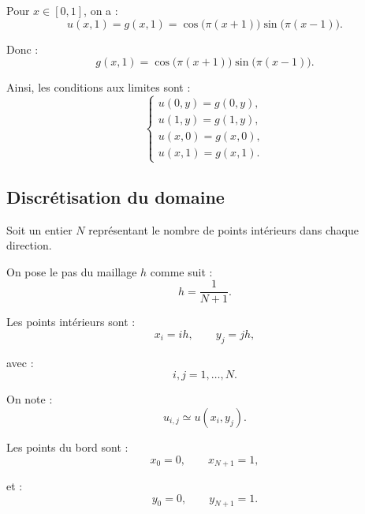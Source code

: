 \documentclass[12pt,a4paper]{article}
\begin{document}
	Pour \(x\in[0,1]\), on a :
	\begin{equation*}
	u(x,1)
	=
	g(x,1)
	=
	\cos\bigl(\pi(x+1)\bigr)
	\sin\bigl(\pi(x-1)\bigr).
	\end{equation*}
	
	Donc :
	\begin{equation*}
	\boxed{
		g(x,1)
		=
		\cos\bigl(\pi(x+1)\bigr)
		\sin\bigl(\pi(x-1)\bigr).
	}
	\end{equation*}
	
	Ainsi, les conditions aux limites sont :
	\begin{equation*}
	\boxed{
		\begin{cases}
		u(0,y)=g(0,y),\\
		u(1,y)=g(1,y),\\
		u(x,0)=g(x,0),\\
		u(x,1)=g(x,1).
		\end{cases}
	}
	\end{equation*}
	
	\subsection{Discrétisation du domaine}
	
	Soit un entier \(N\) représentant le nombre de points intérieurs dans chaque direction.
	
	On pose le pas du maillage $h$ comme suit :
	\begin{equation*}
	h=\frac{1}{N+1}.
	\end{equation*}
	
	Les points intérieurs sont :
	\begin{equation*}
	x_i=ih,
	\qquad
	y_j=jh,
	\end{equation*}
	
	avec :
	\begin{equation*}
	i,j=1,\dots,N.
	\end{equation*}
	
	On note :
	\begin{equation*}
	u_{i,j}\simeq u(x_i,y_j).
	\end{equation*}
	
	Les points du bord sont :
	\begin{equation*}
	x_0=0,
	\qquad
	x_{N+1}=1,
	\end{equation*}
	
	et :
	\begin{equation*}
	y_0=0,
	\qquad
	y_{N+1}=1.
	\end{equation*}
	
\end{document}
